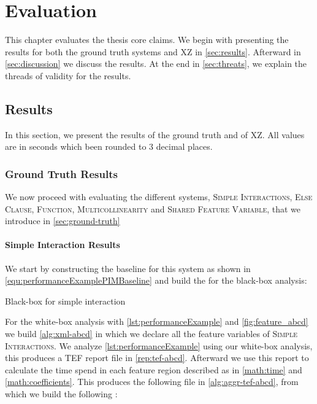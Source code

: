 \chapter{Evaluation}\label{ch:evaluation}
\lstset{style=myStyle}

This chapter evaluates the thesis core claims.  
We begin with presenting the results for both the ground truth systems and \textsc{XZ} in \autoref{sec:results}.
Afterward in \autoref{sec:discussion} we discuss the results. At the end in \autoref{sec:threats}, we explain the threads of validity for the results.

\section{Results}\label{sec:results}

In this section, we present the results of the ground truth and of \textsc{XZ}. All values are in seconds which been rounded to 3 decimal places.

\subsection*{Ground Truth Results}
We now proceed with evaluating the different systems, \textsc{Simple Interactions}, \textsc{Else Clause}, \textsc{Function}, \textsc{Multicollinearity} 
and \textsc{Shared Feature Variable}, that we introduce in \autoref{sec:ground-truth}

\subsubsection*{Simple Interaction Results}
We start by constructing the baseline 
{\perfInfluenceModel} for this system as shown in \autoref{equ:performanceExamplePIMBaseline} and build the {\perfInfluenceModel} for the black-box analysis:

\begin{table}[H]
    \centering
    
    \caption{Black-box {\perfInfluenceModel} for simple interaction}
\end{table}

For the white-box analysis with \autoref{lst:performanceExample} and \autoref{fig:feature_abcd} we build \autoref{alg:xml-abcd} 
in which we declare all the feature variables of \textsc{Simple Interactions}. 
We analyze \autoref{lst:performanceExample} using our white-box analysis, this produces a TEF report file in \autoref{rep:tef-abcd}.
Afterward we use this report to calculate the time spend in each feature region described as in \autoref{math:time} and \autoref{math:coefficients}.
This produces the following file in \autoref{alg:aggr-tef-abcd}, from which we build the following {\perfInfluenceModel}:

